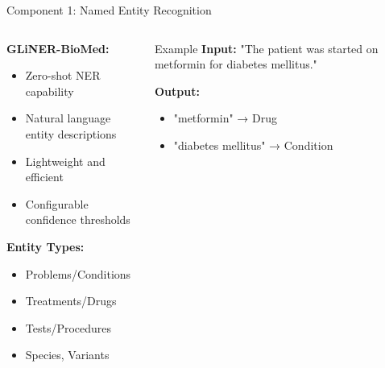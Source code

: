 \documentclass[aspectratio=169, 11pt]{beamer}
\begin{document}
\begin{frame}{Component 1: Named Entity Recognition}
    \vspace{0.3cm}
    \begin{columns}[T]
        \begin{column}{0.5\textwidth}
            \textbf{GLiNER-BioMed:}
            \begin{itemize}
                \setlength{\itemsep}{0.2cm}
                \item Zero-shot NER capability
                \item Natural language entity descriptions
                \item Lightweight and efficient
                \item Configurable confidence thresholds
            \end{itemize}
            
            \vspace{0.4cm}
            \textbf{Entity Types:}
            \begin{itemize}
                \setlength{\itemsep}{0.2cm}
                \item Problems/Conditions
                \item Treatments/Drugs
                \item Tests/Procedures
                \item Species, Variants
            \end{itemize}
        \end{column}
        \begin{column}{0.5\textwidth}
            \vspace{0.5cm}
            \begin{exampleblock}{Example}
                \footnotesize
                \textbf{Input:} "The patient was started on metformin for diabetes mellitus."
                
                \textbf{Output:}
                \begin{itemize}
                    \item \textcolor{nercolor}{"metformin"} → Drug
                    \item \textcolor{linkcolor}{"diabetes mellitus"} → Condition
                \end{itemize}
            \end{exampleblock}
        \end{column}
    \end{columns}
\end{frame}
\end{document}
